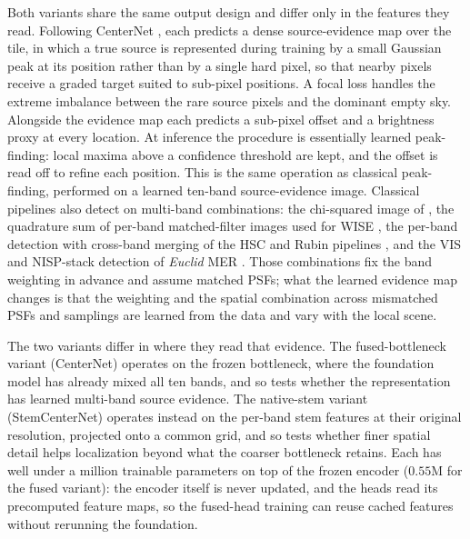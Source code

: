 \documentclass[twocolumn,linenumbers]{aastex701}
\begin{document}
Both variants share the same output design and differ only in the features they read. Following CenterNet \citep[][]{zhou2019}, each predicts a dense source-evidence map over the tile, in which a true source is represented during training by a small Gaussian peak at its position rather than by a single hard pixel, so that nearby pixels receive a graded target suited to sub-pixel positions. A focal loss \citep{lin2018focallossdenseobject} handles the extreme imbalance between the rare source pixels and the dominant empty sky. Alongside the evidence map each predicts a sub-pixel offset and a brightness proxy at every location. At inference the procedure is essentially learned peak-finding: local maxima above a confidence threshold are kept, and the offset is read off to refine each position. This is the same operation as classical peak-finding, performed on a learned ten-band source-evidence image. Classical pipelines also detect on multi-band combinations: the chi-squared image of \citet{Szalay1999}, the quadrature sum of per-band matched-filter images used for WISE \citep{MarshJarrett2012}, the per-band detection with cross-band merging of the HSC and Rubin pipelines \citep{Bosch2018}, and the VIS and NISP-stack detection of \textit{Euclid} MER \citep{MER}. Those combinations fix the band weighting in advance and assume matched PSFs; what the learned evidence map changes is that the weighting and the spatial combination across mismatched PSFs and samplings are learned from the data and vary with the local scene.

The two variants differ in where they read that evidence. The fused-bottleneck variant (CenterNet) operates on the frozen bottleneck, where the foundation model has already mixed all ten bands, and so tests whether the representation has learned multi-band source evidence. The native-stem variant (StemCenterNet) operates instead on the per-band stem features at their original resolution, projected onto a common grid, and so tests whether finer spatial detail helps localization beyond what the coarser bottleneck retains. Each has well under a million trainable parameters on top of the frozen encoder ($0.55$M for the fused variant): the encoder itself is never updated, and the heads read its precomputed feature maps, so the fused-head training can reuse cached features without rerunning the foundation.
\end{document}
